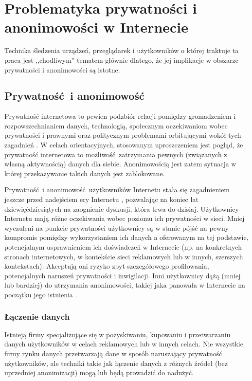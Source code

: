 \chapter{Problematyka prywatności i anonimowości w Internecie}
Technika śledzenia urządzeń, przeglądarek i użytkowników o której traktuje ta
praca jest ,,chodliwym'' tematem głównie dlatego, że jej implikacje w obszarze
prywatności i anonimowości są istotne.

\section{Prywatność i anonimowość}
Prywatność internetowa to pewien podzbiór relacji pomiędzy gromadzeniem i
rozpowszechnianiem danych, technologią, społecznym oczekiwaniom wobec
prywatności i prawnymi oraz politycznym problemami orbitującymi wokół tych
zagadnień \cite{michael2014uberveillance}. W celach orientacyjnych, stosowanym
uproszczeniem jest pogląd, że prywatność internetowa to możliwość zatrzymania
pewnych (związanych z własną aktywnością) danych dla siebie. Anonimowością jest
zatem sytuacja w której przekazywanie takich danych jest zablokowane.

Prywatność i anonimowość użytkowników Internetu stała się zagadnieniem jeszcze
przed nadejściem ery Internetu \cite{david1965some}, pozwalając na koniec lat
dziewięćdziesiątych na zaognienie dyskusji, która trwa do dzisiaj. Użytkownicy
Internetu mają różne oczekiwania wobec poziomu ich prywatności w sieci. Mniej
wyczuleni na punkcie prywatności użytkownicy są w stanie pójść na pewny
kompromis pomiędzy wykorzystaniem ich danych a oferowanym na tej podstawie,
potencjalnym usprawnieniem ich doświadczeń w Internecie (np. na konkretnych
stronach internetowych, w kontekście sieci reklamowych lub w innych, szerszych
kontekstach). Akceptują oni ryzyko zbyt szczegółowego profilowania,
potencjalnych naruszeń prywatności i inwigilacji. Inni użytkownicy dążą (mniej
lub bardziej) do utrzymania anonimowości, takiej jaka panowała w Internecie na
początku jego istnienia \cite[s. 54--69]{snowden2019pamiec}.

\subsection{Łączenie danych}
Istnieją firmy specjalizujące się w pozyskiwaniu, kupowaniu i przetwarzaniu
danych użytkowników w celach reklamowych lub w innych celach. Nie wszystkie
firmy rynku danych przetwarzają dane w sposób naruszający prywatność
użytkowników, ale techniki takie jak łączenie danych z różnych źródeł (bez
uprzedniej anonimizacji) mogą lub będą prowadzić do nadużyć.

